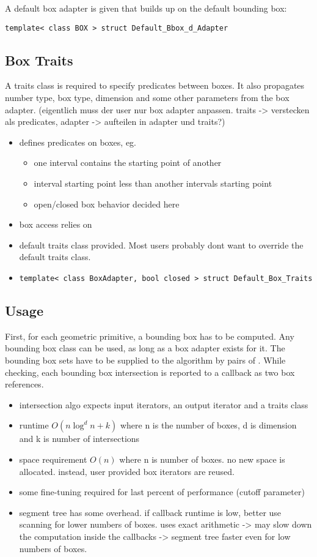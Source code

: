 A default box adapter is given that builds up on the default bounding box:

\texttt{template< class BOX > struct Default\_Bbox\_d\_Adapter}

\subsection*{Box Traits}

A traits class is required to specify predicates between boxes. It
also propagates number type, box type, dimension and some other
parameters from the box adapter. (eigentlich muss der user nur box
adapter anpassen. traits -> verstecken als predicates, adapter ->
aufteilen in adapter und traits?)

\begin{itemize}
 \item defines predicates on boxes, eg.
 \begin{itemize}
  \item one interval contains the starting point of another
  \item interval starting point less than another intervals starting point    
  \item open/closed box behavior decided here
 \end{itemize}
 \item box access relies on 
 \item default traits class provided. Most users probably dont want to override the default traits class. 
 \item \texttt{template< class BoxAdapter, bool closed > struct Default\_Box\_Traits}
\end{itemize}

\subsection*{Usage}
First, for each geometric primitive, a bounding box has to be computed. Any bounding box class can be used, as long as a box adapter exists for it. The bounding box sets have to be supplied to the algorithm by pairs of . While checking, each bounding box intersection is reported to a callback as two box references.


\begin{itemize}
  \item intersection algo expects input iterators, an output iterator and a traits class
  \item runtime $O(n\log^{d}n+k)$ where n is the number of boxes, d is dimension and k is number of intersections
  \item space requirement $O(n)$ where n is number of boxes. no new space is allocated. instead, user provided box iterators are reused.
  \item some fine-tuning required for last percent of performance (cutoff parameter) 
  \item segment tree has some overhead. if callback runtime is low, better use scanning for lower numbers of boxes. \cgal uses exact arithmetic -> may slow down the computation inside the callbacks -> segment tree faster even for low numbers of boxes.  
\end{itemize}

